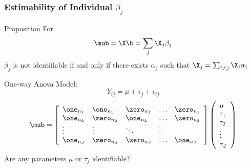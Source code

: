 \documentclass[handout]{beamer}
\begin{document}
\begin{frame}
  \frametitle{Estimability of Individual $\beta_j$}
  \begin{block}{Proposition}
For    $$\mub = \X \b = \sum_j \X_j \beta_j$$
$\beta_j$ is not identifiable  if and only if there exists $\alpha_j$
such that $\X_j = \sum_{i \neq j} \X_i \alpha_i$
  \end{block} \pause
One-way Anova Model:
$$Y_{ij} = \mu + \tau_j + \epsilon_{ij}$$
  $$ \mub =  \left[
    \begin{array}{lllll}
\one_{n_1} & \one_{n_1} & \zero_{n_1} &  \ldots & \zero_{n_1} \\
\one_{n_2} & \zero_{n_2} & \one_{n_2} &  \ldots & \zero_{n_2} \\
\vdots & \vdots & \ddots & \vdots \\
\one_{n_J} & \zero_{n_J} & \zero_{n_J} &  \ldots & \one_{n_J} \\
    \end{array} \right]
 \left(   \begin{array}{l}
      \mu \\
      \tau_1 \\
   \tau_2 \\
 \vdots \\
\tau_J
    \end{array} \right)
$$\pause
Are any parameters $\mu$ or $\tau_j$ identifiable?
\end{frame}
\end{document}
